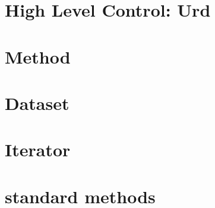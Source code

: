 \documentclass[a4paper]{report}
\begin{document}
\chapter{High Level Control:  Urd}


\chapter{Method}


\chapter{Dataset}


\chapter{Iterator}


\chapter{standard methods}


%
\end{document}
